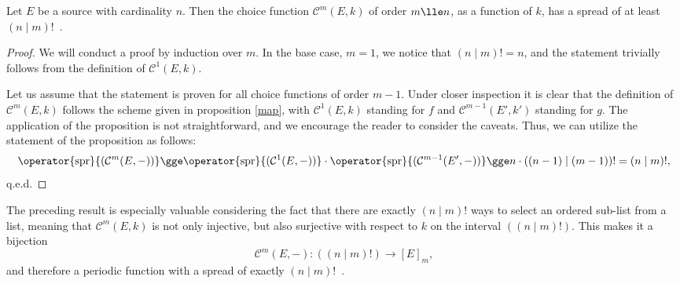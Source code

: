\documentclass[12pt, a4paper]{article}
\renewcommand{\C}{\mathcal{C}}
\newcommand{\spr}[1]{\operator{\mathrm{spr}}{(#1)}}
\begin{document}
\begin{proposition}
    Let $ E $ be a source with cardinality $ n $. Then the choice function $ \C^m(E, k) $ of order $ m \lle n $, as a function of $ k $, has a spread of at least $ (n \mid m)! $\ .
\end{proposition}
\begin{proof}
    We will conduct a proof by induction over $ m $. In the base case, $ m = 1 $, we notice that $ (n \mid m)! = n $, and the statement trivially follows from the definition of $ \C^1(E, k) $.

    Let us assume that the statement is proven for all choice functions of order $ m - 1 $. Under closer inspection it is clear that the definition of $ \C^m(E, k) $ follows the scheme given in proposition \ref{map}, with $ \C^1(E, k) $ standing for $ f $ and $ \C^{m-1}(E', k') $ standing for $ g $. The application of the proposition is not straightforward, and we encourage the reader to consider the caveats. Thus, we can utilize the statement of the proposition as follows:
    \[ \spr{\C^m(E, -)} \gge \spr{\C^1(E, -)} \cdot \spr{\C^{m-1}(E', -)} \gge n \cdot ((n-1) \mid (m-1))! = (n \mid m)!, \]
    q.e.d.
\end{proof}

The preceding result is especially valuable considering the fact that there are exactly $ (n \mid m)! $ ways to select an ordered sub-list from a list, meaning that $ \C^m(E, k) $ is not only injective, but also surjective with respect to $ k $ on the interval $ ((n \mid m)!) $. This makes it a bijection
\[ \C^m(E, -) \colon ((n \mid m)!) \to [E]_m, \]
and therefore a periodic function with a spread of exactly $ (n \mid m)! $\ .
\end{document}
